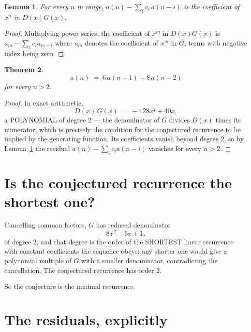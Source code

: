 \documentclass[11pt,a4paper]{article}
\theoremstyle{plain}
\newtheorem{theorem}{Theorem}
\newtheorem{lemma}[theorem]{Lemma}
\theoremstyle{definition}
\begin{document}
\begin{lemma}\label{lem:key}
For every $n$ in range, $a(n)-\sum_i c_i\,a(n-i)$ is the coefficient of $x^{n}$ in
$D(x)G(x)$.
\end{lemma}

\begin{proof}
Multiplying power series, the coefficient of $x^{m}$ in $D(x)G(x)$ is
$a_m-\sum_i c_i a_{m-i}$ where $a_m$ denotes the coefficient of $x^{m}$ in $G$, terms with
negative index being zero.
\end{proof}

\begin{theorem}
\[
a(n)\;=\;6\,a(n-1) - 8\,a(n-2)
\]
for every $n>2$.
\end{theorem}

\begin{proof}
In exact arithmetic,
\[
D(x)\,G(x)\;=\;- 128 x^{2} + 40 x,
\]
a POLYNOMIAL of degree $2$ --- the denominator of $G$ divides $D(x)$ times its numerator,
which is precisely the condition for the conjectured recurrence to be implied by the
generating function. Its coefficients vanish beyond degree $2$, so by
Lemma~\ref{lem:key} the residual $a(n)-\sum_ic_ia(n-i)$ vanishes for every
$n>2$.
\end{proof}

\section{Is the conjectured recurrence the shortest one?}

Cancelling common factors, $G$ has reduced denominator
\[
8 x^{2} - 6 x + 1,
\]
of degree $2$, and that degree is the order of the SHORTEST linear recurrence with
constant coefficients the sequence obeys: any shorter one would give a polynomial multiple of
$G$ with a smaller denominator, contradicting the cancellation. The conjectured recurrence has
order $2$.

So the conjecture is the minimal recurrence.

\section{The residuals, explicitly}
\end{document}
